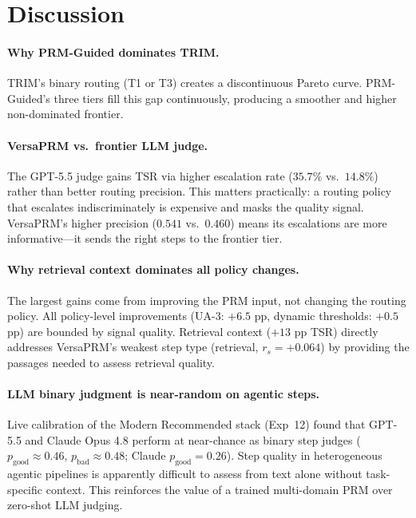\documentclass[sigconf,natbib=false]{acmart}
\begin{document}
\section{Discussion}
\label{sec:discussion}

\paragraph{Why PRM-Guided dominates TRIM.}
TRIM's binary routing (T1 or T3) creates a discontinuous Pareto curve.
PRM-Guided's three tiers fill this gap continuously, producing a smoother and
higher non-dominated frontier.

\paragraph{VersaPRM vs.\ frontier LLM judge.}
The GPT-5.5 judge gains TSR via higher escalation rate ($35.7\%$ vs.\ $14.8\%$)
rather than better routing precision.  This matters practically: a routing
policy that escalates indiscriminately is expensive and masks the quality signal.
VersaPRM's higher precision ($0.541$ vs.\ $0.460$) means its escalations are
more informative---it sends the right steps to the frontier tier.

\paragraph{Why retrieval context dominates all policy changes.}
The largest gains come from improving the PRM input, not changing the routing
policy.  All policy-level improvements (UA-3: $+6.5$ pp, dynamic thresholds:
$+0.5$ pp) are bounded by signal quality.  Retrieval context ($+13$ pp TSR)
directly addresses VersaPRM's weakest step type (retrieval, $r_s = +0.064$)
by providing the passages needed to assess retrieval quality.

\paragraph{LLM binary judgment is near-random on agentic steps.}
Live calibration of the Modern Recommended stack (Exp~12) found that GPT-5.5
and Claude Opus 4.8 perform at near-chance as binary step judges
($p_\text{good} \approx 0.46$, $p_\text{bad} \approx 0.48$; Claude
$p_\text{good} = 0.26$).  Step quality in heterogeneous agentic pipelines is
apparently difficult to assess from text alone without task-specific context.
This reinforces the value of a trained multi-domain PRM over zero-shot LLM
judging.
\end{document}
